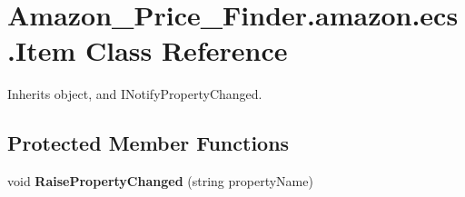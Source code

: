 \hypertarget{class_amazon___price___finder_1_1amazon_1_1ecs_1_1_item}{\section{Amazon\-\_\-\-Price\-\_\-\-Finder.\-amazon.\-ecs.\-Item Class Reference}
\label{class_amazon___price___finder_1_1amazon_1_1ecs_1_1_item}
}


 




Inherits object, and I\-Notify\-Property\-Changed.

\subsection*{Protected Member Functions}
\begin{DoxyCompactItemize}
\item 
\hypertarget{class_amazon___price___finder_1_1amazon_1_1ecs_1_1_item_a7fd0f15d940087825d6d6de9a93d9917}{void {\bfseries Raise\-Property\-Changed} (string property\-Name)}\label{class_amazon___price___finder_1_1amazon_1_1ecs_1_1_item_a7fd0f15d940087825d6d6de9a93d9917}

\end{DoxyCompactItemize}
